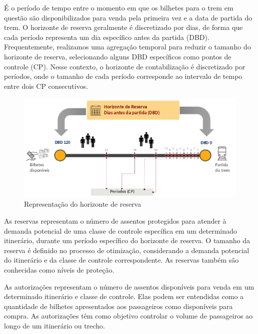 \begin{description}[style=unboxed, leftmargin=0cm]
	\item[Horizonte de reserva:] É o período de tempo entre o momento em que os bilhetes para o trem em questão são disponibilizados para venda pela primeira vez e a data de partida do trem. O horizonte de reserva geralmente é discretizado por dias, de forma que cada período representa um dia específico antes da partida (DBD). Frequentemente, realizamos uma agregação temporal para reduzir o tamanho do horizonte de reserva, selecionando alguns DBD específicos como pontos de controle (CP). Nesse contexto, o horizonte de contabilização é discretizado por períodos, onde o tamanho de cada período corresponde ao intervalo de tempo entre dois CP consecutivos.

	      \begin{figure}[H]
		      \begin{center}
			      \includegraphics[scale=0.53]{img/h_reserva.png}
			      \caption{Representação do horizonte de reserva}
			      \label{fig: h_reserva}
		      \end{center}
	      \end{figure}
	      \vspace{-1cm}

	\item[Reservas:] As reservas representam o número de assentos protegidos para atender à demanda potencial de uma classe de controle específica em um determinado itinerário, durante um período específico do horizonte de reserva. O tamanho da reserva é definido no processo de otimização, considerando a demanda potencial do itinerário e da classe de controle correspondente. As reservas também são conhecidas como níveis de proteção.

	\item[Autorizações:] As autorizações representam o número de assentos disponíveis para venda em um determinado itinerário e classe de controle. Elas podem ser entendidas como a quantidade de bilhetes apresentados aos passageiros como disponíveis para compra. As autorizações têm como objetivo controlar o volume de passageiros ao longo de um itinerário ou trecho.
	

\end{description}
